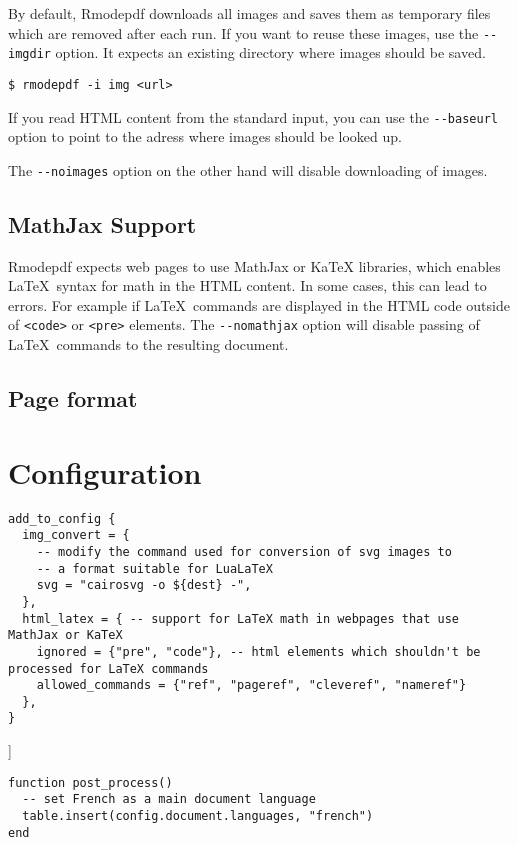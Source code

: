 \documentclass{article}
\begin{document}
By default, Rmodepdf downloads all images and saves them as temporary files which are removed
after each run. If you want to reuse these images, use the \verb|--imgdir| option. It expects
an existing directory where images should be saved.

\begin{verbatim}
$ rmodepdf -i img <url>
\end{verbatim}

If you read HTML content from the standard input, you can use the \verb|--baseurl| option to  
point to the adress where images should be looked up.

The \verb|--noimages| option on the other hand will disable downloading of images.

\subsection{MathJax Support}

Rmodepdf expects web pages to use MathJax or KaTeX libraries, which enables \LaTeX\ syntax for math 
in the HTML content. In some cases, this can lead to errors. For example if  \LaTeX\ commands are 
displayed in the HTML code outside of \verb|<code>| or \verb|<pre>| elements. The \verb|--nomathjax| option
will disable passing of \LaTeX\ commands to the resulting document.


\subsection{Page format}




\section{Configuration}


\begin{verbatim}
add_to_config {
  img_convert = { 
    -- modify the command used for conversion of svg images to 
    -- a format suitable for LuaLaTeX
    svg = "cairosvg -o ${dest} -", 
  },
  html_latex = { -- support for LaTeX math in webpages that use MathJax or KaTeX
    ignored = {"pre", "code"}, -- html elements which shouldn't be processed for LaTeX commands
    allowed_commands = {"ref", "pageref", "cleveref", "nameref"}
  },
}
\end{verbatim}]


\begin{verbatim}
function post_process()
  -- set French as a main document language
  table.insert(config.document.languages, "french")
end
\end{verbatim}
\end{document}
